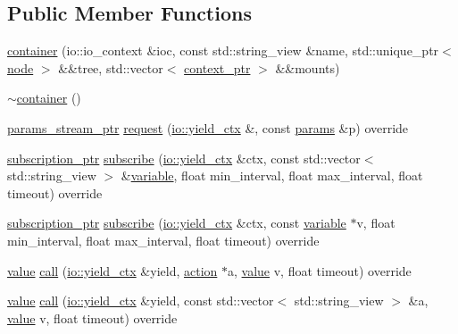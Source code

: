 \subsection*{Public Member Functions}
\begin{DoxyCompactItemize}
\item 
\hyperlink{classtelegraph_1_1container_a1bdc819f7250ab657c2b512994b2a4d9}{container} (io\+::io\+\_\+context \&ioc, const std\+::string\+\_\+view \&name, std\+::unique\+\_\+ptr$<$ \hyperlink{classtelegraph_1_1node}{node} $>$ \&\&tree, std\+::vector$<$ \hyperlink{namespacetelegraph_a332e681f0d44a1308cf3a013a9dd140f}{context\+\_\+ptr} $>$ \&\&mounts)
\item 
\hyperlink{classtelegraph_1_1container_a8f6afe0f414694ed550d654e722e4ae4}{$\sim$container} ()
\item 
\hyperlink{namespacetelegraph_ad071241508ea0f86c7de0686016f9ca9}{params\+\_\+stream\+\_\+ptr} \hyperlink{classtelegraph_1_1container_ade9ce299ee72554a84c1a71f0ad37915}{request} (\hyperlink{structboost_1_1asio_1_1yield__ctx}{io\+::yield\+\_\+ctx} \&, const \hyperlink{classtelegraph_1_1params}{params} \&p) override
\item 
\hyperlink{namespacetelegraph_a58641aa5b1a2cbdb0431916a87069f64}{subscription\+\_\+ptr} \hyperlink{classtelegraph_1_1container_ae1ae26a08bf3d367bbc13020623780b2}{subscribe} (\hyperlink{structboost_1_1asio_1_1yield__ctx}{io\+::yield\+\_\+ctx} \&ctx, const std\+::vector$<$ std\+::string\+\_\+view $>$ \&\hyperlink{classtelegraph_1_1variable}{variable}, float min\+\_\+interval, float max\+\_\+interval, float timeout) override
\item 
\hyperlink{namespacetelegraph_a58641aa5b1a2cbdb0431916a87069f64}{subscription\+\_\+ptr} \hyperlink{classtelegraph_1_1container_aa11f4e622d784b566a032c05f2019264}{subscribe} (\hyperlink{structboost_1_1asio_1_1yield__ctx}{io\+::yield\+\_\+ctx} \&ctx, const \hyperlink{classtelegraph_1_1variable}{variable} $\ast$v, float min\+\_\+interval, float max\+\_\+interval, float timeout) override
\item 
\hyperlink{classtelegraph_1_1value}{value} \hyperlink{classtelegraph_1_1container_a499649499d61f07dbe44bbec933414a0}{call} (\hyperlink{structboost_1_1asio_1_1yield__ctx}{io\+::yield\+\_\+ctx} \&yield, \hyperlink{classtelegraph_1_1action}{action} $\ast$a, \hyperlink{classtelegraph_1_1value}{value} v, float timeout) override
\item 
\hyperlink{classtelegraph_1_1value}{value} \hyperlink{classtelegraph_1_1container_a83d26f574b7f75655be9752147e30dce}{call} (\hyperlink{structboost_1_1asio_1_1yield__ctx}{io\+::yield\+\_\+ctx} \&yield, const std\+::vector$<$ std\+::string\+\_\+view $>$ \&a, \hyperlink{classtelegraph_1_1value}{value} v, float timeout) override

\end{DoxyCompactItemize}
